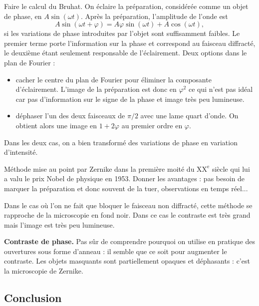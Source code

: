 Faire le calcul du Bruhat.
On éclaire la préparation, considérée comme un objet de phase, en $A\sin(\omega t)$.
Après la préparation, l'amplitude de l'onde est 
\begin{equation}
A\sin(\omega t +\varphi) = A\varphi\sin(\omega t) + A\cos(\omega t),
\end{equation}
si les variations de phase introduites par l'objet sont suffisamment faibles.
Le premier terme porte l'information sur la phase et correspond au faisceau diffracté, le deuxième étant seulement responsable de l'éclairement.
Deux options dans le plan de Fourier :
\begin{itemize}
\item cacher le centre du plan de Fourier pour éliminer la composante d'éclairement.
L'image de la préparation est donc en $\varphi^2$ ce qui n'est pas idéal car pas d'information sur le signe de la phase et image très peu lumineuse.
\item déphaser l'un des deux faisceaux de $\pi/2$ avec une lame quart d'onde.
On obtient alors une image en $1+2\varphi$ au premier ordre en $\varphi$.
\end{itemize}
Dans les deux cas, on a bien transformé des variations de phase en variation d'intensité.

Méthode mise au point par Zernike dans la première moité du $\mathrm{XX^e}$ siècle qui lui a valu le prix Nobel de physique en 1953.
Donner les avantages : pas besoin de marquer la préparation et donc souvent de la tuer, observations en temps réel...

\begin{remarque}
Dans le cas où l'on ne fait que bloquer le faisceau non diffracté, cette méthode se rapproche de la microscopie en fond noir.
Dans ce cas le contraste est très grand mais l'image est très peu lumineuse.
\end{remarque}

\begin{slide}
\textbf{Contraste de phase.}
Pas sûr de comprendre pourquoi on utilise en pratique des ouvertures sous forme d'anneau : il semble que ce soit pour augmenter le contraste.
Les objets masquants sont partiellement opaques et déphasants : c'est la microscopie de Zernike.
\end{slide}

\subsection*{Conclusion}

